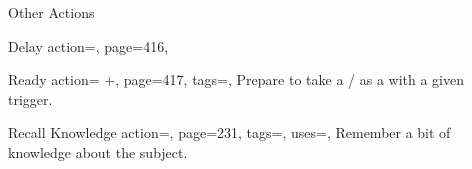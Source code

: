 \begin{PageBack}
\begin{Tables}{\backTableHeight}
\begin{Table}{Other Actions}
\begin{entry}{Delay}{%
                action=,
                page=416,
            }
            \end{entry}
            \begin{entry}{Ready}{%
                action= +,
                page=417,
                tags=\Concentrate,
            }
                Prepare to take a /\! as a  with a given trigger.
            \end{entry}
            \begin{entry}{Recall Knowledge}{%
                action=,
                page=231,
                tags=\Concentrate,
                uses={\VariousKnowledge[tags={S}]},
            }
                Remember a bit of knowledge about the subject.\hfill{}\quad{}
            \end{entry}
        \end{Table}
    \end{Tables}%
\end{PageBack}




